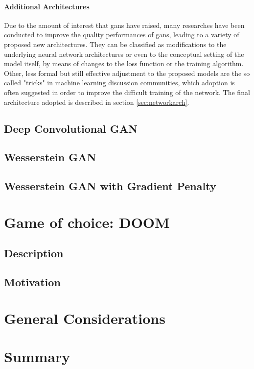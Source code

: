 \paragraph{Additional Architectures} Due to the amount of interest that \glspl{gan} have raised, many researches have been conducted to improve the quality performances of \glspl{gan}, leading to a variety of proposed new architectures. They can be classified as modifications to the underlying neural network architectures or even to the conceptual setting of the model itself, by means of changes to the loss function or the training algorithm. Other, less formal but still effective adjustment to the proposed models are the so called "tricks" in machine learning discussion communities, which adoption is often suggested in order to improve the difficult training of the network. The final architecture adopted is described in section \ref{sec:networkarch}.


\subsection{Deep Convolutional GAN}
\subsection{Wesserstein GAN}
\subsection{Wesserstein GAN with Gradient Penalty}
\section{Game of choice: DOOM}
\label{sec:doominfo}
\subsection{Description}
\subsection{Motivation}


\section{General Considerations}
\label{sec:considerations}
\section{Summary}
